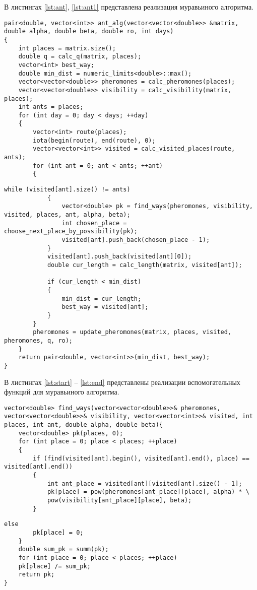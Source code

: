 В листингах \ref{lst:ant}, \ref{lst:ant1} представлена реализация муравьиного алгоритма.

\begin{center}
	\begin{lstlisting}[label=lst:ant,caption=Муравьиный алгоритм (начало)]
pair<double, vector<int>> ant_alg(vector<vector<double>> &matrix, double alpha, double beta, double ro, int days)
{
	int places = matrix.size();
	double q = calc_q(matrix, places);
	vector<int> best_way;
	double min_dist = numeric_limits<double>::max();
	vector<vector<double>> pheromones = calc_pheromones(places);
	vector<vector<double>> visibility = calc_visibility(matrix, places);
	int ants = places;
	for (int day = 0; day < days; ++day)
	{
		vector<int> route(places);
		iota(begin(route), end(route), 0);
		vector<vector<int>> visited = calc_visited_places(route, ants);
		for (int ant = 0; ant < ants; ++ant)
		{
		\end{lstlisting}
	\clearpage
\begin{lstlisting}[label=lst:ant1,caption=Муравьиный алгоритм (окончание)]
			while (visited[ant].size() != ants)
			{
				vector<double> pk = find_ways(pheromones, visibility, visited, places, ant, alpha, beta);
				int chosen_place = choose_next_place_by_possibility(pk);
				visited[ant].push_back(chosen_place - 1);
			}
			visited[ant].push_back(visited[ant][0]);
			double cur_length = calc_length(matrix, visited[ant]);
			
			if (cur_length < min_dist)
			{
				min_dist = cur_length;
				best_way = visited[ant];
			}
		}
		pheromones = update_pheromones(matrix, places, visited, pheromones, q, ro);
	}
	return pair<double, vector<int>>(min_dist, best_way);
}
	\end{lstlisting}
\end{center}

В листингах \ref{lst:start} -- \ref{lst:end} представлены реализации вспомогательных функций для муравьиного алгоритма.

\begin{center}
	\begin{lstlisting}[label=lst:start,caption=Алгоритм нахождения массива вероятностей переходов (начало)]
vector<double> find_ways(vector<vector<double>>& pheromones, vector<vector<double>>& visibility, vector<vector<int>>& visited, int places, int ant, double alpha, double beta){
	vector<double> pk(places, 0);
	for (int place = 0; place < places; ++place)
	{
		if (find(visited[ant].begin(), visited[ant].end(), place) == visited[ant].end())
		{
			int ant_place = visited[ant][visited[ant].size() - 1];
			pk[place] = pow(pheromones[ant_place][place], alpha) * \
			pow(visibility[ant_place][place], beta);
		}
	\end{lstlisting}
\clearpage
\begin{lstlisting}[caption=Алгоритм нахождения массива вероятностей переходов (окончание)]
		else
		pk[place] = 0;
	}
	double sum_pk = summ(pk);
	for (int place = 0; place < places; ++place)
	pk[place] /= sum_pk;
	return pk;
}
	\end{lstlisting}
\end{center}

